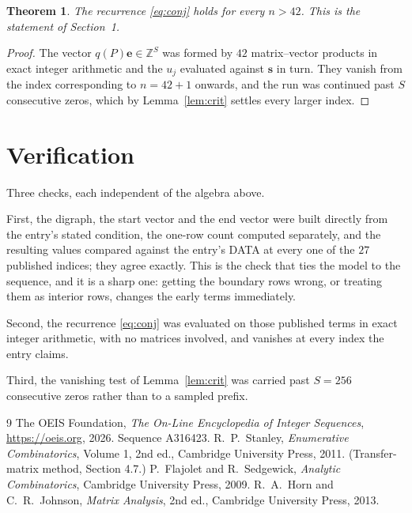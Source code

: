 \documentclass[11pt,a4paper]{article}
\theoremstyle{plain}
\newtheorem{theorem}{Theorem}
\theoremstyle{definition}
\begin{document}
\begin{theorem}
The recurrence \eqref{eq:conj} holds for every $n>42$. This is the statement of
Section~1.
\end{theorem}

\begin{proof}
The vector $q(P)\mathbf{e}\in\mathbb{Z}^{S}$ was formed by $42$ matrix--vector
products in exact integer arithmetic and the $u_j$ evaluated against $\mathbf{s}$ in turn.
They vanish from the index corresponding to $n=42+1$ onwards, and the run was continued
past $S$ consecutive zeros, which by Lemma~\ref{lem:crit} settles every larger index.
\end{proof}

\section{Verification}

Three checks, each independent of the algebra above.

First, the digraph, the start vector and the end vector were built directly from the
entry's stated condition, the one-row count computed separately, and the resulting values
compared against the entry's DATA at every one of the $27$ published indices; they
agree exactly. This is the check that ties the model to the sequence, and it is a sharp one:
getting the boundary rows wrong, or treating them as interior rows, changes the early terms
immediately.

Second, the recurrence \eqref{eq:conj} was evaluated on those published terms in exact
integer arithmetic, with no matrices involved, and vanishes at every index the entry claims.

Third, the vanishing test of Lemma~\ref{lem:crit} was carried past $S=256$ consecutive
zeros rather than to a sampled prefix.

\begin{thebibliography}{9}
 The OEIS Foundation, \emph{The On-Line Encyclopedia of Integer
Sequences}, \url{https://oeis.org}, 2026. Sequence A316423.
 R.~P.~Stanley, \emph{Enumerative Combinatorics}, Volume 1, 2nd ed.,
Cambridge University Press, 2011. (Transfer-matrix method, Section 4.7.)
 P.~Flajolet and R.~Sedgewick, \emph{Analytic Combinatorics}, Cambridge
University Press, 2009.
 R.~A.~Horn and C.~R.~Johnson, \emph{Matrix Analysis}, 2nd ed., Cambridge
University Press, 2013.
\end{thebibliography}
\end{document}
